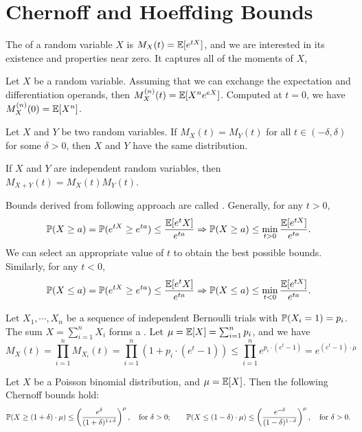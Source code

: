 \documentclass[main.tex]{subfiles}
\begin{document}
\minispacing

\section{Chernoff and Hoeffding Bounds}

The  of a random variable $X$ is $M_X(t)=\mathbb{E}[e^{tX}]$, and we are interested in its existence and properties near zero. It captures all of the moments of $X$, 

\begin{theorem}
	Let $X$ be a random variable. Assuming that we can exchange the expectation and differentiation operands, then $M_X^{(n)}(t)=\mathbb{E}[X^ne^{eX}]$. Computed at $t=0$, we have $M_X^{(n)}(0)=\mathbb{E}[X^n]$.
\end{theorem}

\begin{theorem}
	Let $X$ and $Y$ be two random variables. If $M_X(t)=M_Y(t)$ for all $t \in (-\delta, \delta)$ for some $\delta > 0$, then $X$ and $Y$ have the same distribution.
\end{theorem}

\begin{theorem}
	If $X$ and $Y$ are independent random variables, then $M_{X+Y}(t)=M_X(t)M_Y(t)$.
\end{theorem}

Bounds derived from following approach are called . Generally, for any $t > 0$,
\[\mathbb{P}(X\ge a)=\mathbb{P}(e^{tX}\ge e^{ta})\le\frac{\mathbb{E}[e^tX]}{e^{ta}} \Rightarrow \mathbb{P}(X\ge a)\le \min_{t>0}\frac{\mathbb{E}[e^{tX}]}{e^{ta}}.\]
We can select an appropriate value of $t$ to obtain the best possible bounds. Similarly, for any $t < 0$,
\[\mathbb{P}(X\le a)=\mathbb{P}(e^{tX}\ge e^{ta})\le\frac{\mathbb{E}[e^tX]}{e^{ta}} \Rightarrow \mathbb{P}(X\le a)\le \min_{t<0}\frac{\mathbb{E}[e^{tX}]}{e^{ta}}.\]

Let $X_1,\cdots,X_n$ be a sequence of independent Bernoulli trials with $\mathbb{P}(X_i=1)=p_i$. The sum $X=\sum_{i=1}^{n}X_i$ forms a . Let $\mu=\mathbb{E}[X]=\sum_{i=1}^{n}p_i$, and we have
\[M_X(t)=\prod_{i=1}^{n}M_{X_i}(t)=\prod_{i=1}^{n}\left(1+p_i\cdot (e^t-1)\right)\le\prod_{i=1}^{n}e^{p_i\cdot(e^t-1)}=e^{(e^t-1)\cdot\mu}\]

\begin{theorem}
	Let $X$ be a Poisson binomial distribution, and $\mu=\mathbb{E}[X]$. Then the following Chernoff bounds hold:
	\[
		\mathbb{P}(X\ge(1+\delta)\cdot\mu)\le\left(\frac{e^\delta}{(1+\delta)^{1+\delta}}\right)^\mu,\quad \text{for } \delta > 0;\qquad
		\mathbb{P}(X\le(1-\delta)\cdot\mu)\le\left(\frac{e^{-\delta}}{(1-\delta)^{1-\delta}}\right)^\mu,\quad \text{for } \delta > 0. 
	\]
\end{theorem}
\end{document}
